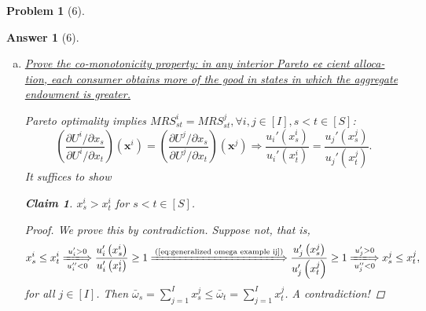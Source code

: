 \documentclass{article}
\newtheorem*{ans}{Answer}
\newtheorem*{prob}{{\bf Problem}}
\newtheorem{claim}{Claim}
\newcommand{\1}{{\bf 1}}
\newcommand{\cK}{\mathcal{K}}
\newcommand{\0}{{\mathbf{0}}}
\newcommand{\x}{{\mathbf{x}}}
\newcommand{\<}{\langle}
\renewcommand{\>}{\rangle}
\begin{document}
\begin{prob}[6]
\end{prob}
\begin{ans}[6] \begin{enumerate}[(a)]
		\item \ul{Prove the co-monotonicity property: in any interior Pareto e¢ cient alloca- tion, each consumer obtains more of the good in states in which the aggregate endowment is greater.}
		
		Pareto optimality implies $MRS_{st}^i = MRS_{st}^j,\forall i,j \in [I],s< t \in [S] $:
\begin{equation}\left(\frac{\partial U^i / \partial  x_s}{\partial U^i / \partial  x_t}\right)\left(\x^i \right) = 		\left(\frac{\partial U^j / \partial  x_s}{\partial U^j / \partial  x_t}\right) \left(\x^j\right) \Rightarrow
\frac{  u_i' \left(x_s^i\right) }{  u_i' \left(x_t^i \right)} = 	\frac{ u_j' \left(x_s^j\right) }{ u_j' \left(x_t^j  \right) 	}.
 \label{eq:generalized omega example ij}
\end{equation}
%
It suffices to show
\begin{mdframed}
	\begin{claim}$x_s^i > x_t^i $ for $s<t \in [S]$.
\end{claim}
\end{mdframed}
\begin{proof}
We prove this by contradiction. Suppose not, that is,
%
%
$$ x_s^i \le x_t^i\xLongrightarrow[ u_i'' <0]{u_i'>0} \frac{  u_i'\left(x_s^i\right) }{  u_i' \left(x^i_t \right)} \ge 1 \xLongrightarrow{\text{(\ref{eq:generalized omega example ij})}}  \frac{ u_j' \left(   x_s^j\right) }{ u_j' \left(  x_t^j \right) 	} \ge 1 \xLongrightarrow[ u_j'' <0]{u_j'>0} x_s^j \le  x_t^j, $$ 
for all $j \in [I]$. Then $\bar \omega_s  = \sum_{j =1 }^I x_s^j \le \bar \omega_t  = \sum_{j =1 }^I x_t^j $. A contradiction!
\end{proof}


\end{enumerate}
\end{ans}
\end{document}
